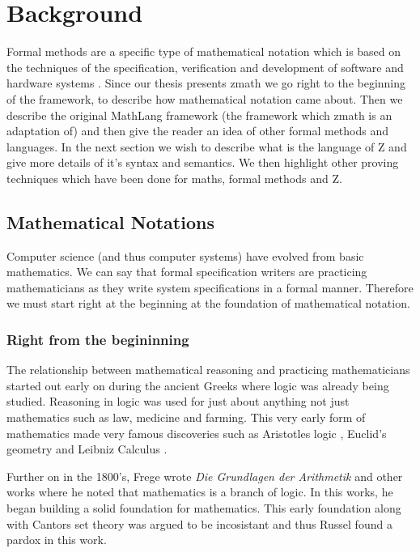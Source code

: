 \chapter{Background}
\label{ch:background}

Formal methods are a specific type of mathematical notation which is based on the techniques of the specification, verification and development of software and hardware systems \cite{whatareformalmethods}. Since our thesis presents \gls{zmath} we go right to the beginning of the framework, to describe how mathematical notation came about. Then we describe the original MathLang framework (the framework which \gls{zmath} is an adaptation of) and then give the reader an idea of other formal methods and languages. In the next section we wish to describe what is the language of Z and give more details of it's syntax and semantics. We then highlight other proving techniques which have been done for maths, formal methods and Z.

\section{Mathematical Notations}

Computer science (and thus computer systems) have evolved from basic mathematics. We can say that formal specification writers are practicing mathematicians as they write system specifications in a formal manner. Therefore we must start right at the beginning at the foundation of mathematical notation.

\subsection{Right from the begininning}

The relationship between mathematical reasoning and practicing mathematicians started out early on during the ancient Greeks where logic was already being studied. Reasoning in logic was used for just about anything not just mathematics such as law, medicine and farming. This very early form of mathematics made very famous discoveries such as Aristotles logic \cite{aristotle}, Euclid's geometry \cite{euclid} and Leibniz Calculus \cite{leibniz}.

Further on in the 1800's, Frege wrote \emph{Die Grundlagen der Arithmetik} \cite{frege} and other works where he noted that mathematics is a branch of logic. In this works, he began building a solid foundation for mathematics. This early foundation along with Cantors set theory \cite{cantor} was argued to be incosistant and thus Russel found a pardox in this work.

